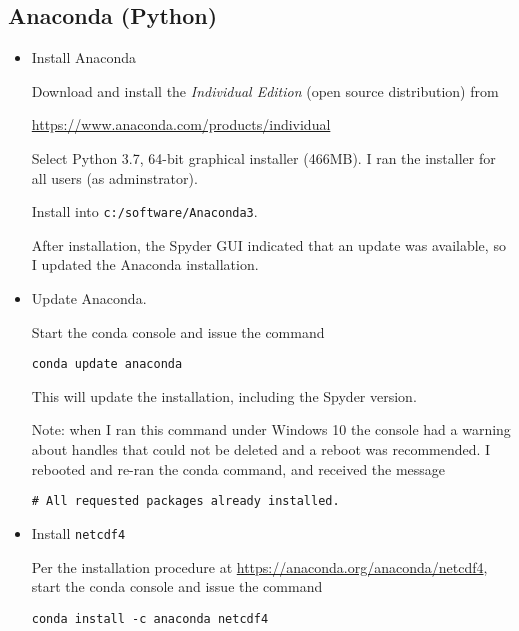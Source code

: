 \documentclass[10pt,twoside]{article}
\begin{document}
\subsection{Anaconda (Python)}

\begin{itemize}
\item Install Anaconda

Download and install the \emph{Individual Edition} (open source distribution) from
%
\begin{center}
\href{https://www.anaconda.com/products/individual}{https://www.anaconda.com/products/individual}
\end{center}
%
Select Python 3.7, 64-bit graphical installer (466MB). I ran the installer
for all users (as adminstrator).

Install into \verb+c:/software/Anaconda3+.

After installation, the Spyder GUI indicated that an update was available, so
I updated the Anaconda installation. 

\item Update Anaconda.

Start the conda console and issue the command

\begin{verbatim}
conda update anaconda
\end{verbatim}

This will update the installation, including the Spyder version.

Note: when I ran this command under Windows 10 the console had a warning about handles that could not be deleted and a reboot was recommended. I rebooted and re-ran the conda command, and received the message

\begin{verbatim}
# All requested packages already installed.
\end{verbatim}

\item Install \verb+netcdf4+ 

Per the installation procedure at \href{https://anaconda.org/anaconda/netcdf4}
{https://anaconda.org/anaconda/netcdf4}, start the conda console and issue the 
command

\begin{verbatim}
conda install -c anaconda netcdf4
\end{verbatim}


\end{itemize}
\end{document}
